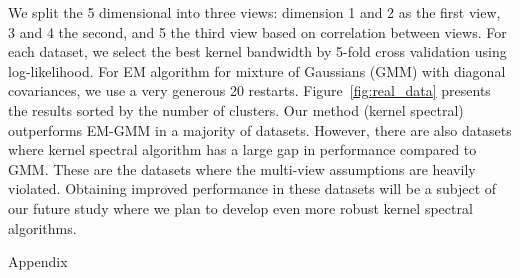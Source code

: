 \documentclass{article}
\begin{document}
We split the 5 dimensional into three views: dimension 1 and 2 as the first view, 3 and 4 the second, and 5 the third view based on correlation between views. For each dataset, we select the best kernel bandwidth by 5-fold cross validation using log-likelihood. For EM algorithm for mixture of Gaussians (GMM) with diagonal covariances, we use a very generous 20 restarts. Figure~\ref{fig:real_data} presents the results sorted by the number of clusters. Our method (kernel spectral) outperforms EM-GMM in a majority of datasets. However, there are also datasets where kernel spectral algorithm has a large gap in performance compared to GMM. These are the datasets where the multi-view assumptions are heavily violated. Obtaining improved performance in these datasets will be a subject of our future study where we plan to develop even more robust kernel spectral algorithms.

%

\clearpage
\newpage




\clearpage
\newpage

\onecolumn

\begin{center}
{\Large Appendix}
\end{center}
\end{document}
